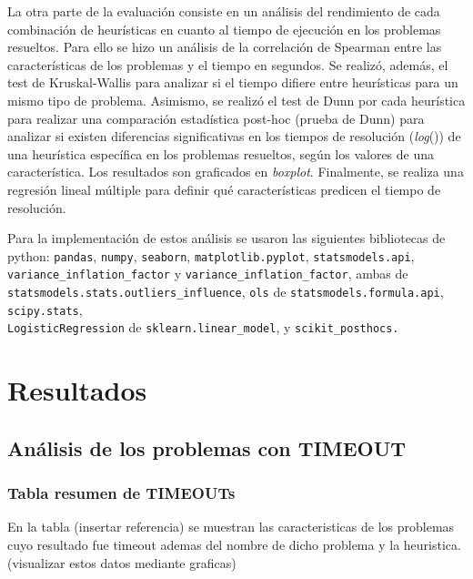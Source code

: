 La otra parte de la evaluaci\'on consiste en un an\'alisis del rendimiento de cada combinaci\'on de heur\'isticas en cuanto al tiempo de ejecuci\'on en los problemas resueltos. Para ello se hizo un an\'alisis de la correlaci\'on de Spearman entre las caracter\'isticas de los problemas y el tiempo en segundos. Se realiz\'o, adem\'as, el test de Kruskal-Wallis para analizar si el tiempo difiere entre heur\'isticas para un mismo tipo de problema. Asimismo, se realiz\'o el test de Dunn por cada heur\'istica para realizar una comparaci\'on estad\'istica post-hoc (prueba de Dunn) para analizar si existen diferencias significativas en los tiempos de resoluci\'on (\textit{log}()) de una heur\'istica espec\'ifica en los problemas resueltos, seg\'un los valores de una caracter\'istica. 
Los resultados son graficados en \textit{boxplot}. Finalmente, se realiza una regresi\'on lineal m\'ultiple para definir qu\'e caracter\'isticas predicen el tiempo de resoluci\'on.

Para la implementaci\'on de estos an\'alisis se usaron las siguientes bibliotecas de python: \texttt{pandas}, \texttt{numpy}, \texttt{seaborn}, \texttt{matplotlib.pyplot}, \texttt{statsmodels.api},\\ \texttt{variance\_inflation\_factor} y \texttt{variance\_inflation\_factor}, ambas de \\ \texttt{statsmodels.stats.outliers\_influence}, \texttt{ols} de \texttt{statsmodels.formula.api}, \texttt{scipy.stats},\\ \texttt{LogisticRegression} de \texttt{sklearn.linear\_model}, y \texttt{scikit\_posthocs.}

\section{Resultados}
\subsection{An\'alisis de los problemas con TIMEOUT}

\subsubsection{Tabla resumen de TIMEOUTs}
En la tabla (insertar referencia) se muestran las caracteristicas de los problemas cuyo resultado fue timeout ademas del nombre de dicho problema y la heuristica. (visualizar estos datos mediante graficas)

